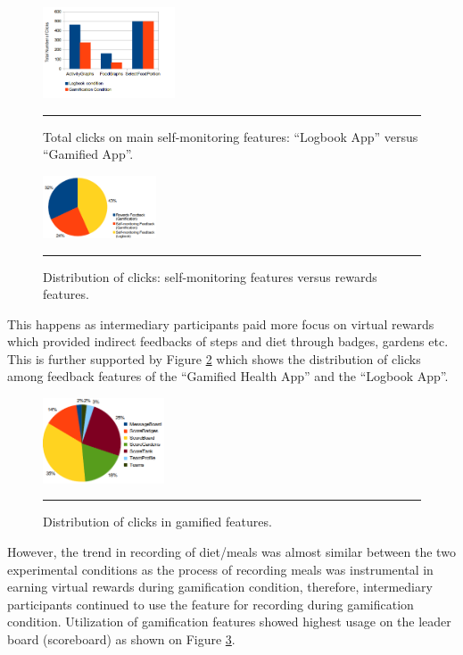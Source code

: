 \documentclass{sig-alternate}
\begin{document}
\begin{figure}[htbp]
  \centering
    \includegraphics[width=0.35\textwidth]{self_monitoring_usage.png}
    \rule{26em}{0.5pt}
  \caption{Total clicks on main self-monitoring features: ``Logbook App'' versus ``Gamified App''.}
  \label{figure:self_monitoring_usage}
\end{figure}\newline
\begin{figure}[htbp]
  \centering
    \includegraphics[width=0.3\textwidth]{clicks_distr.png}
    \rule{26em}{0.5pt}
  \caption{Distribution of clicks: self-monitoring features versus rewards features.}
  \label{figure:clicks_distr}
\end{figure}\newline 
This happens as intermediary participants paid more focus on virtual rewards which provided indirect feedbacks of steps and diet through badges, gardens etc. This is further supported by Figure \ref{figure:clicks_distr} which shows the distribution of clicks among feedback features of the ``Gamified Health App'' and the ``Logbook App''.
\begin{figure}[htbp]
  \centering
    \includegraphics[width=0.32\textwidth]{clicks_rewards.png}
    \rule{26em}{0.5pt}
  \caption{Distribution of clicks in gamified features.}
  \label{figure:rewards_clicks}
\end{figure}
However, the trend in recording of diet/meals was almost similar between the two experimental conditions as the process of recording meals was instrumental in earning virtual rewards during gamification condition, therefore, intermediary participants continued to use the feature for recording during gamification condition. Utilization of gamification features showed highest usage on the leader board (scoreboard) as shown on Figure \ref{figure:rewards_clicks}.\newline
\end{document}
